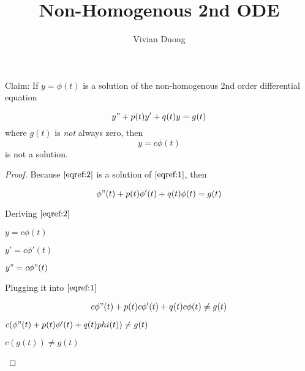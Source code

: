 \documentclass{article}
\title{Non-Homogenous 2nd ODE}
\author{Vivian Duong}
\begin{document}
Claim: If $y = \phi(t)$ is a solution of the non-homogenous 2nd order differential equation 

\begin{equation} \label{eqref:1}
y" + p(t)y' + q(t)y = g(t)
\end{equation}
where $g(t)$ is \textit{not} always zero, then 
\begin{equation} \label{eqref:2}
y = c\phi(t)
\end{equation}
is not a solution.

\begin{proof}
Because $\eqref{eqref:2}$ is a solution of $\eqref{eqref:1}$, then

\begin{equation} \label{eqref:3}
\phi"(t) + p(t)\phi'(t) + q(t)\phi(t) = g(t)
\end{equation}

Deriving $\eqref{eqref:2}$

\begin{center}
$y = c\phi(t)$

$y' = c\phi'(t)$

$y" = c\phi"(t)$

\end{center}
Plugging it into $\eqref{eqref:1}$


\begin{equation}
c\phi"(t) + p(t)c\phi'(t) + q(t)c\phi(t) \neq g(t)
\end{equation}
\begin{center}
$c(\phi"(t) + p(t)\phi'(t) + q(t)phi(t)) \neq g(t)$

$c(g(t)) \neq g(t)$
\end{center}

\end{proof}
\end{document}
